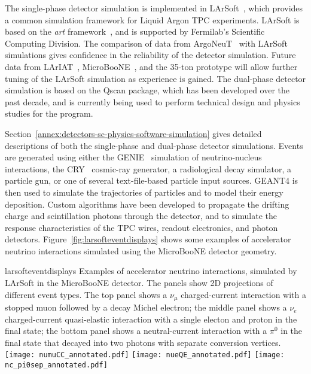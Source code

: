 The single-phase detector simulation is implemented in LArSoft~\cite{Church:2013hea},
which provides a common simulation framework for Liquid Argon TPC experiments.
LArSoft is based on the {\it art} framework~\cite{Green:2012gv}, and is supported by Fermilab's
Scientific Computing Division.
The comparison of data from ArgoNeuT~\cite{Anderson:2012vc} with LArSoft
simulations gives confidence in the reliability of the detector simulation.
Future data from LArIAT~\cite{Adamson:2013/02/28tla,Cavanna:2014iqa},
MicroBooNE~\cite{Chen:2007ae,Jones:2011ci,microboonecdr}, and the 35-ton prototype will allow
further tuning of the LArSoft simulation as experience is gained.
The dual-phase detector simulation is based on the Qscan package,
which has been developed over the past decade, and is currently
being used to perform technical design and physics studies for
the \cerndualproto{} program.

Section~\ref{annex:detectors-sc-physics-software-simulation} gives detailed
descriptions of both the single-phase and dual-phase detector simulations.
Events are generated using either the GENIE~\cite{GENIE} simulation of 
neutrino-nucleus interactions, the CRY~\cite{Cosmic-CRY,Cosmic-CRY-protons,CRY-url} cosmic-ray generator, 
a radiological decay simulator, a particle gun, or one of several
text-file-based particle input sources. GEANT4 is then used to simulate the trajectories
of particles and to model their energy deposition.  
Custom algorithms have been developed to propagate the drifting charge
and scintillation photons through the detector, and to simulate the
response characteristics of the TPC wires, readout electronics, and photon detectors.
Figure~\ref{fig:larsofteventdisplays} shows some examples of accelerator
neutrino interactions simulated using the MicroBooNE detector geometry.

\begin{cdrfigure}{larsofteventdisplays}
{Examples of accelerator neutrino interactions, simulated by LArSoft in the 
MicroBooNE detector. The panels show 2D projections of different event types.
The top panel shows a $\nu_{\mu}$ charged-current interaction with a stopped muon followed
by a decay Michel electron; the middle panel shows a $\nu_{e}$ charged-current 
quasi-elastic interaction with a single electon and proton in the final state;
the bottom panel shows a neutral-current interaction with a $\pi^{0}$ in the final state
that decayed into two photons with separate conversion vertices.}
\texttt{[image: numuCC\_annotated.pdf]}
\texttt{[image: nueQE\_annotated.pdf]}
\texttt{[image: nc\_pi0sep\_annotated.pdf]}
\end{cdrfigure}

